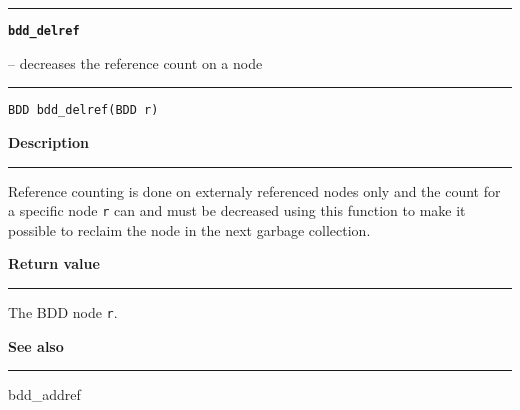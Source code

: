 \begin{minipage}{\textwidth}

\noindent\begin{minipage}{\textwidth}
\rule{\textwidth}{0.5mm}
{\tt\bf bdd\_delref }
\--- decreases the reference count on a node  \hspace{\fill}
\\\rule[1.5ex]{\textwidth}{0.5mm}
\end{minipage}

\noindent\begin{verbatim}
BDD bdd_delref(BDD r) 
\end{verbatim}

\vspace{\parsep}\noindent
{\bf Description}\\\rule[1.5ex]{\textwidth}{0.2mm}\vspace{-1.5ex}\setlength{\parindent}{1em}
Reference counting is done on externaly referenced nodes only
           and the count for a specific node {\tt r} can and must be
	   decreased using this function to make it possible to reclaim the
	   node in the next garbage collection. 

\setlength{\parindent}{0em}\vspace{\parsep}\vspace{\baselineskip}\noindent
{\bf Return value}\\\rule[1.5ex]{\textwidth}{0.2mm}\vspace{-1.5ex}
The BDD node {\tt r}. 

\vspace{\parsep}\vspace{\baselineskip}\noindent
{\bf See also}\\\rule[1.5ex]{\textwidth}{0.2mm}\vspace{-1.5ex}
bdd\_addref 
\end{minipage}
\vspace{8ex}
